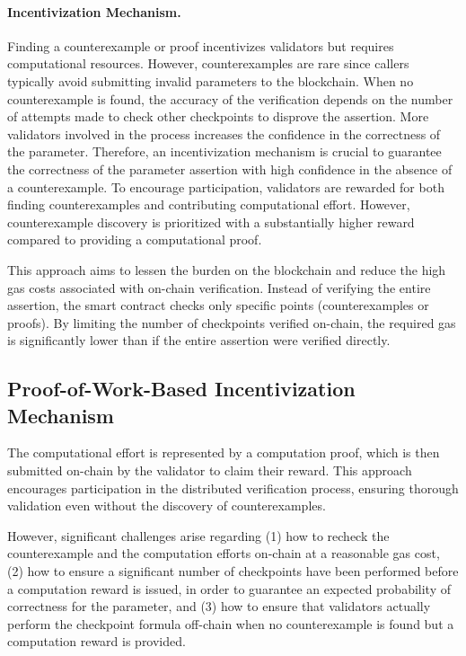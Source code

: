 \documentclass[runningheads]{llncs}
\begin{document}
\paragraph{\textbf{Incentivization Mechanism.}} Finding a counterexample or proof incentivizes validators but requires computational resources. However, counterexamples are rare since callers typically avoid submitting invalid parameters to the blockchain. When no counterexample is found, the accuracy of the verification depends on the number of attempts made to check other checkpoints to disprove the assertion. More validators involved in the process increases the confidence in the correctness of the parameter. Therefore, an incentivization mechanism is crucial to guarantee the correctness of the parameter assertion with high confidence in the absence of a counterexample. To encourage participation, validators are rewarded for both finding counterexamples and contributing computational effort. However, counterexample discovery is prioritized with a substantially higher reward compared to providing a computational proof.

This approach aims to lessen the burden on the blockchain and reduce the high gas costs associated with on-chain verification. Instead of verifying the entire assertion, the smart contract checks only specific points (counterexamples or proofs). By limiting the number of checkpoints verified on-chain, the required gas is significantly lower than if the entire assertion were verified directly.
\subsection{Proof-of-Work-Based Incentivization Mechanism}
The computational effort is represented by a computation proof, which is then submitted on-chain by the validator to claim their reward. This approach encourages participation in the distributed verification process, ensuring thorough validation even without the discovery of counterexamples.

However, significant challenges arise regarding (1) how to recheck the counterexample and the computation efforts on-chain at a reasonable gas cost, (2) how to ensure a significant number of checkpoints have been performed before a computation reward is issued, in order to guarantee an expected probability of correctness for the parameter, and (3) how to ensure that validators actually perform the checkpoint formula off-chain when no counterexample is found but a computation reward is provided.
\end{document}
